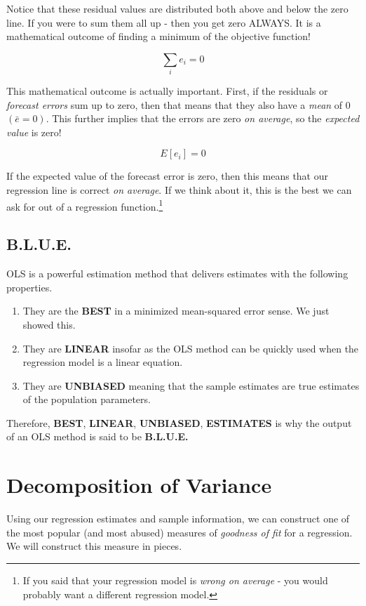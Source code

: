 \documentclass[
]{book}
\begin{document}
Notice that these residual values are distributed both above and below the zero line. If you were to sum them all up - then you get zero ALWAYS. It is a mathematical outcome of finding a minimum of the objective function!

\[\sum_ie_i=0\]

This mathematical outcome is actually important. First, if the residuals or \emph{forecast errors} sum up to zero, then that means that they also have a \emph{mean} of 0 \((\bar{e}=0)\). This further implies that the errors are zero \emph{on average}, so the \emph{expected value} is zero!

\[E[e_i]=0\]

If the expected value of the forecast error is zero, then this means that our regression line is correct \emph{on average}. If we think about it, this is the best we can ask for out of a regression function.\footnote{If you said that your regression model is \emph{wrong on average} - you would probably want a different regression model.}

\subsection{B.L.U.E.}\label{b.l.u.e.}

OLS is a powerful estimation method that delivers estimates with the following properties.

\begin{enumerate}
\def\labelenumi{\arabic{enumi}.}
\item
  They are the \textbf{BEST} in a minimized mean-squared error sense. We just showed this.
\item
  They are \textbf{LINEAR} insofar as the OLS method can be quickly used when the regression model is a linear equation.
\item
  They are \textbf{UNBIASED} meaning that the sample estimates are true estimates of the population parameters.
\end{enumerate}

Therefore, \textbf{BEST}, \textbf{LINEAR}, \textbf{UNBIASED}, \textbf{ESTIMATES} is why the output of an OLS method is said to be \textbf{B.L.U.E.}

\section{Decomposition of Variance}\label{decomposition-of-variance}

Using our regression estimates and sample information, we can construct one of the most popular (and most abused) measures of \emph{goodness of fit} for a regression. We will construct this measure in pieces.
\end{document}
